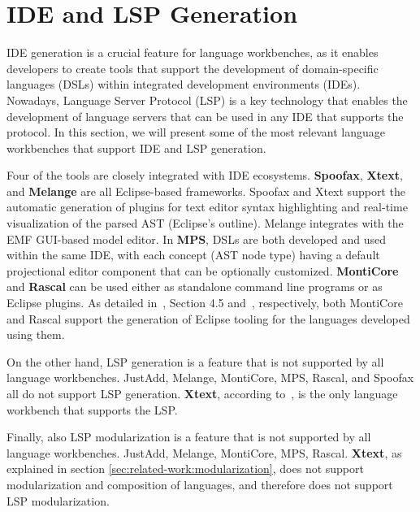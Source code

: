 \section{IDE and LSP Generation}\label{sec:related-work:ide-support}

IDE generation is a crucial feature for language workbenches, as it enables developers to create tools that support the development of domain-specific languages (DSLs) within integrated development environments (IDEs).
Nowadays, Language Server Protocol (LSP) is a key technology that enables the development of language servers that can be used in any IDE that supports the protocol. In this section, we will present some of the most relevant language workbenches that support IDE and LSP generation.

Four of the tools are closely integrated with IDE ecosystems. \textbf{Spoofax}, \textbf{Xtext}, and \textbf{Melange} are all Eclipse-based frameworks. Spoofax and Xtext support the automatic generation of plugins for text editor syntax highlighting and real-time visualization of the parsed AST (Eclipse’s outline). Melange integrates with the EMF GUI-based model editor. In \textbf{MPS}, DSLs are both developed and used within the same IDE, with each concept (AST node type) having a default projectional editor component that can be optionally customized. \textbf{MontiCore} and \textbf{Rascal} can be used either as standalone command line programs or as Eclipse plugins. As detailed in~\cite{Krahn10}, Section 4.5 and~\cite{Inostroza21}, respectively, both MontiCore and Rascal support the generation of Eclipse tooling for the languages developed using them.

On the other hand, LSP generation is a feature that is not supported by all language workbenches. JustAdd, Melange, MontiCore, MPS, Rascal, and Spoofax all do not support LSP generation. \textbf{Xtext}, according to~\cite{Bunder19a}, is the only language workbench that supports the LSP.

Finally, also LSP modularization is a feature that is not supported by all language workbenches. JustAdd, Melange, MontiCore, MPS, Rascal. \textbf{Xtext}, as explained in section \ref{sec:related-work:modularization}, does not support modularization and composition of languages, and therefore does not support LSP modularization.

